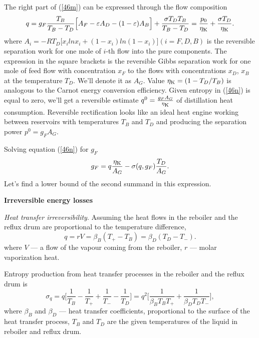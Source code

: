 \documentclass[12pt]{article}
\begin{document}
The right part of (\ref{46m}) can be expressed through the flow composition
\begin{equation}\label{46n}
q= g_{F}\frac{T_B}{T_B- T_D}\Big[ A_F-\varepsilon A_D-(1-\varepsilon)A_B\Big]+\frac{\sigma T_DT_B}{T_B- T_D}=\frac{p_0}{\eta_{{\mbox{\scriptsize K}}}}+ \frac{\sigma T_D}{\eta_{{\mbox{\scriptsize K}}}}.
\end{equation}
where $ A_i=-RT_D\Big[x_ilnx_i +(1-x_i)ln(1-x_i)\Big](i=F,D,B)$ is the reversible separation work for one mole of $i$-th flow into the pure components. The expression in the square brackets is the reversible Gibbs separation work for one mole of feed flow with concentration $x_F$ to the flows with concentrations $x_D$, $x_B$ at the temperature $T_D$. We'll denote it as $A_G$. Value $\eta_{{\mbox{\scriptsize K}}}= (1- {T_D}/{T_B})$ is analogous to the Carnot energy conversion efficiency. Given entropy in (\ref{46n}) is equal to zero, we'll get a reversible estimate $q^0=\frac{g_FA_G}{\eta_{{\mbox{\scriptsize K}}}}$ of distillation heat consumption. Reversible rectification looks like an ideal heat engine working between reservoirs with temperatures $T_B$ and $T_D$ and producing the separation power $p^0=g_F A_G$.

Solving  equation (\ref{46n}) for $g_F$
\begin{equation}\label{46n1}
g_F=q\frac{\eta_{{\mbox{\scriptsize K}}}}{A_G}-\sigma(q,g_F)\frac{T_D}{A_G}.
\end{equation}
Let's find a lower bound of the second summand in this expression.
 

\vspace*{0.3cm}
\textbf{Irreversible energy losses}

\textit{Heat transfer irreversibility}. Assuming the heat flows in the reboiler and the reflux drum are proportional to the temperature difference,
\begin{equation} 
q=rV=\beta_{B}(T_+-T_B)=\beta_{D}(T_D-T_-).
\label{q3a}
\end{equation}
where $V$ --- a flow of the vapour coming from the reboiler, $r$ --- molar vaporization heat.

Entropy production from heat transfer processes in the reboiler and the reflux drum is
\begin{equation}
\sigma_q = q\Big[\frac{1}{T_B}-\frac{1}{T_+}+\frac{1}{T_-}-\frac{1}{T_D} \Big]=q^2\Big[\frac{1}{\beta_{B}T_B T_{+}} +\frac{1}{\beta_{D}T_D T_{-}}\Big],
\label{q3}
\end{equation}
where $\beta_{B}$ and $\beta_{D}$ --- heat transfer coefficients, proportional to the surface of the heat transfer process, $T_B$ and $T_D$ are the given temperatures of the liquid in reboiler and reflux drum. 
\end{document}
